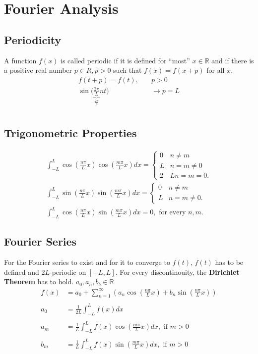 \section{Fourier Analysis}

\subsection{Periodicity}
A function $f(x)$ is called periodic if it is defined for “most” $x \in \mathbb{R} $ and if there is a positive real number $p \in R, p > 0$ such that $f(x) = f(x+p)$ for all $x$.
\begin{align*}
    f(t+p)=f(t),\quad                                                  & p>0             \\
    \sin\biggl( \underbrace{\frac{2\pi}{L}}_{\frac{2\pi}{p}}nt \biggr) & \rightarrow p=L \\
\end{align*}

\subsection{Trigonometric Properties}
\begin{align*}
    \int_{-L}^L\cos\left(\frac{n\pi}Lx\right)\cos\left(\frac{m\pi}Lx\right)dx=\begin{cases}0&n\neq m\\L&n=m\neq0\\2&Ln=m=0.\end{cases} \\
    \int_{-L}^L\sin\left(\frac{n\pi}Lx\right)\sin\left(\frac{m\pi}Lx\right)dx=\begin{cases}0&n\neq m\\L&n=m\neq0.\end{cases}           \\
    \int_{-L}^L\cos\left(\frac{n\pi}Lx\right)\sin\left(\frac{m\pi}Lx\right)dx=0,\text{ for every }n,m.
\end{align*}

\subsection{Fourier Series}
For the Fourier series to exist and for it to converge to $f(t)$, $f(t)$ has to be defined and $2L$-periodic on $[-L,L]$.
For every discontinouity, the \textbf{Dirichlet Theorem} has to hold. $a_0,a_n,b_b\in \mathbb{R}$
\begin{align*}
    f(x)  & =a_0+\sum_{n=1}^\infty\left(a_n\cos\left(\frac{n\pi}Lx\right)+b_n\sin\left(\frac{n\pi}Lx\right)\right) \\ \\
    a_{0} & =\frac{1}{2L}\int_{-L}^{L}f(x)dx                                                                       \\ \\
    a_{m} & =\frac{1}{L}\int_{-L}^{L}f(x)\cos\left(\frac{m\pi}{L}x\right)dx,\text{ if }m>0                         \\ \\
    b_{m} & =\frac{1}{L}\int_{-L}^{L}f(x)\sin\left(\frac{m\pi}{L}x\right)dx,\text{ if }m>0
\end{align*}
